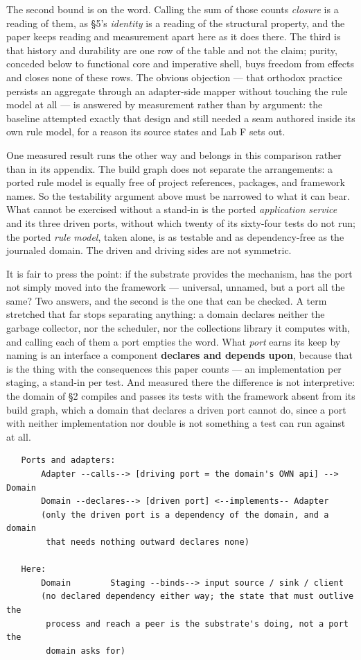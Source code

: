 \documentclass[
]{article}
\newcounter{none} %
\begin{document}
The second bound is on the word. Calling the sum of those counts
\emph{closure} is a reading of them, as §5's \emph{identity} is a
reading of the structural property, and the paper keeps reading and
measurement apart here as it does there. The third is that history and
durability are one row of the table and not the claim; purity, conceded
below to functional core and imperative shell, buys freedom from effects
and closes none of these rows. The obvious objection --- that orthodox
practice persists an aggregate through an adapter-side mapper without
touching the rule model at all --- is answered by measurement rather
than by argument: the baseline attempted exactly that design and still
needed a seam authored inside its own rule model, for a reason its
source states and Lab F sets out.

One measured result runs the other way and belongs in this comparison
rather than in its appendix. The build graph does not separate the
arrangements: a ported rule model is equally free of project references,
packages, and framework names. So the testability argument above must be
narrowed to what it can bear. What cannot be exercised without a
stand-in is the ported \emph{application service} and its three driven
ports, without which twenty of its sixty-four tests do not run; the
ported \emph{rule model}, taken alone, is as testable and as
dependency-free as the journaled domain. The driven and driving sides
are not symmetric.

It is fair to press the point: if the substrate provides the mechanism,
has the port not simply moved into the framework --- universal, unnamed,
but a port all the same? Two answers, and the second is the one that can
be checked. A term stretched that far stops separating anything: a
domain declares neither the garbage collector, nor the scheduler, nor
the collections library it computes with, and calling each of them a
port empties the word. What \emph{port} earns its keep by naming is an
interface a component \textbf{declares and depends upon}, because that
is the thing with the consequences this paper counts --- an
implementation per staging, a stand-in per test. And measured there the
difference is not interpretive: the domain of §2 compiles and passes its
tests with the framework absent from its build graph, which a domain
that declares a driven port cannot do, since a port with neither
implementation nor double is not something a test can run against at
all.

\begin{verbatim}
   Ports and adapters:
       Adapter --calls--> [driving port = the domain's OWN api] --> Domain
       Domain --declares--> [driven port] <--implements-- Adapter
       (only the driven port is a dependency of the domain, and a domain
        that needs nothing outward declares none)

   Here:
       Domain        Staging --binds--> input source / sink / client
       (no declared dependency either way; the state that must outlive the
        process and reach a peer is the substrate's doing, not a port the
        domain asks for)
\end{verbatim}
\end{document}
